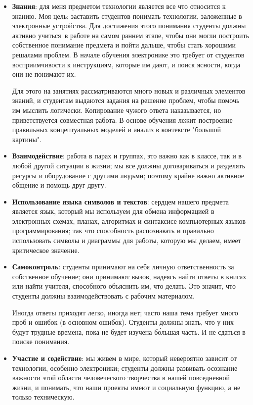 \begin{itemize}

\item\textbf{Знания}: для меня предметом технологии является все что относится к
знанию. Моя цель: заставить студентов понимать технологии, заложенные в
электронные устройства. Для достижения этого понимания студенты должны активно
учиться\
в работе на самом раннем этапе, чтобы они могли построить собственное понимание
предмета и пойти дальше, чтобы стать хорошими решалами проблем. В начале
обучения электронике это требует от студентов восприимчивости к инструкциям,
которые им дают, и поиск ясности, когда они не понимают их.

Для этого на занятиях рассматриваются много новых и различных элементов знаний,
и студентам выдаются задания на решение проблем, чтобы помочь им мыслить
логически. Копирование чужого ответа наказывается, но приветствуется совместная
работа. В основе обучения лежит построение правильных концептуальных моделей и
анализ в контексте "большой картины".

\item\textbf{Взаимодействие}: работа в парах и группах, это важно как в классе,
так и в любой другой ситуации в жизни; мы все должны договариваться и разделять
ресурсы и оборудование с другими людьми; поэтому крайне важно активное общение и
помощь друг другу.

\item\textbf{Использование языка символов и текстов}: сердцем нашего предмета
является язык, который мы используем для обмена информацией в электронных
схемах, планах, алгоритмах и синтаксисе компьютерных языков программирования;
так что способность распознавать и правильно использовать символы и диаграммы для
работы, которую мы делаем, имеет критическое значение.

\item\textbf{Самоконтроль}: студенты принимают на себя личную ответственность за
собственное обучение; они принимают вызов, надеясь найти ответы в книгах или
найти учителя, способного объяснить им, что делать. Это значит, что студенты
должны взаимодействовать с рабочим материалом. 

Иногда ответы приходят легко, иногда нет; часто наша тема требует много проб и
ошибок (в основном ошибок). Студенты должны знать, что у них будут трудные
времена, пока не будет изучена б\'{о}льшая часть. И не сдаться в поиске
понимания.

\item\textbf{Участие и содействие}: мы живем в мире, который невероятно зависит
от технологии, особенно электроники; студенты должны развивать осознание
важности этой области человеческого творчества в нашей повседневной жизни, и
понимать, что наши проекты имеют и социальную функцию, а не только техническую.

\end{itemize}

